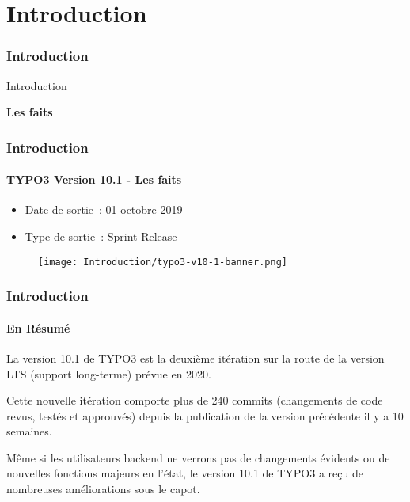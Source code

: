 %

\section{Introduction}
\begin{frame}[fragile]
	\frametitle{Introduction}

	\begin{center}\huge{Introduction}\end{center}
	\begin{center}\huge{\color{typo3darkgrey}\textbf{Les faits}}\end{center}

\end{frame}


\begin{frame}[fragile]
	\frametitle{Introduction}
	\framesubtitle{TYPO3 Version 10.1 - Les faits}

	\begin{itemize}
		\item Date de sortie~: 01 octobre 2019
		\item Type de sortie~: Sprint Release
	\end{itemize}

	\begin{figure}
		\texttt{[image: Introduction/typo3-v10-1-banner.png]}
	\end{figure}

\end{frame}


\begin{frame}[fragile]
	\frametitle{Introduction}
	\framesubtitle{En Résumé}

	\small
		La version 10.1 de TYPO3 est la deuxième itération sur la route de
		la version LTS (support long-terme) prévue en 2020.

		\vspace{0.2cm}

		Cette nouvelle itération comporte plus de 240 commits (changements
		de code revus, testés et approuvés) depuis la publication de la
		version précédente il y a 10 semaines.

		\vspace{0.2cm}

		Même si les utilisateurs backend ne verrons pas de changements évidents ou de
		nouvelles fonctions majeurs en l'état, le version 10.1 de TYPO3 a reçu de
		nombreuses améliorations sous le capot.

	\normalsize

\end{frame}

